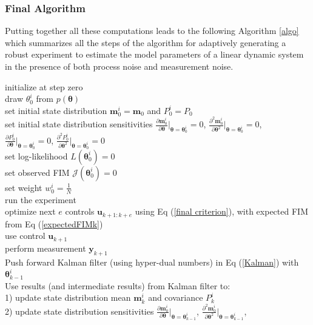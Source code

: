 \subsubsection{Final Algorithm}
Putting together all these computations leads to the following Algorithm \ref{algo} which summarizes all the steps of the algorithm for adaptively generating a robust experiment to estimate the model parameters of a linear dynamic system in the presence of both process noise and measurement noise.\\
\begin{algorithm}[H]
	\SetAlgoLined
	initialize at step zero\\
	{
		draw $\theta^i_0$ from $p(\bm \theta)$\\
		set initial state distribution $\bm m_0^i = \bm m_0$ and $P_0^i = P_0$\\
		set initial state distribution sensitivities
		$\frac{\partial \bm m_0^i}{\partial \bm \theta}\Bigr|_{\bm \theta = \bm \theta_0^i} = 0$, 
		$\frac{\partial^2 \bm m_0^i}{\partial \bm \theta^2}\Bigr|_{\bm \theta = \bm \theta_0^i} = 0$,			$\frac{\partial P_0^i}{\partial \bm \theta}\Bigr|_{\bm \theta = \bm \theta_0^i} = 0$,
		$\frac{\partial^2 P_0^i}{\partial \bm \theta^2}\Bigr|_{\bm \theta = \bm \theta_0^i} = 0$
		\\
		set log-likelihood $L(\bm \theta_0^i) = 0$\\
		set observed FIM $\mathcal{J}(\bm \theta_0^i) = 0$\\
		set weight $w_0^i = \frac{1}{N}$\\
	}
	run the experiment\\
	{
		optimize next $e$ controls $\bm u_{k+1:k+e}$ using Eq (\ref{final criterion}), with expected FIM from Eq (\ref{expectedFIMk}) \\
		use control $\bm u_{k+1}$\\
		perform measurement $\bm y_{k+1}$\\
		{	Push forward Kalman filter (using hyper-dual numbers) in Eq (\ref{Kalman}) with $\bm \theta_{k-1}^i$\\
			Use results (and intermediate results) from Kalman filter to:\\
			1) update state distribution mean $\bm m_k^i$ and covariance $P_k^i$\\
			2) update state distribution sensitivities  
			$\frac{\partial \bm m_0^i}{\partial \bm \theta}\Bigr|_{\bm \theta = \bm \theta_{k-1}^i}$, 
			$\frac{\partial^2 \bm m_0^i}{\partial \bm \theta^2}\Bigr|_{\bm \theta = \bm \theta_{k-1}^i}$,
}}
\end{algorithm}
